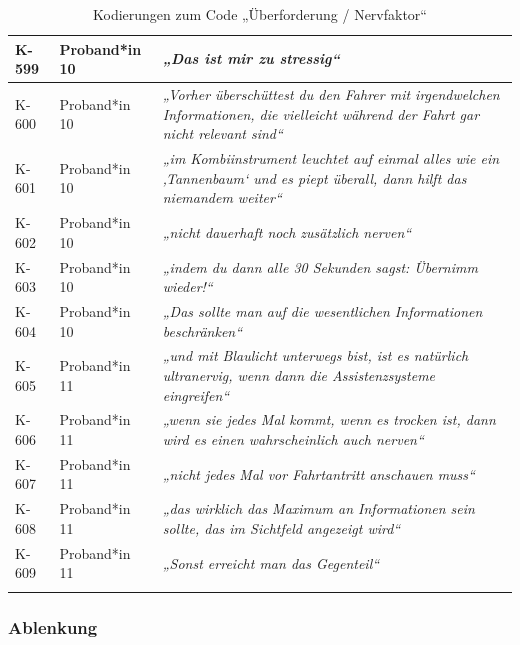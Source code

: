 {\begin{xltabular}{\textwidth}{
    |P{0.10\textwidth}
    |P{0.17\textwidth}
    |Y|
}
\hline
K-599 & Proband*in 10 & \textit{„Das ist mir zu stressig“} \\
\hline
K-600 & Proband*in 10 & \textit{„Vorher überschüttest du den Fahrer mit irgendwelchen Informationen, die vielleicht während der Fahrt gar nicht relevant sind“} \\
\hline
K-601 & Proband*in 10 & \textit{„im Kombiinstrument leuchtet auf einmal alles wie ein ‚Tannenbaum‘ und es piept überall, dann hilft das niemandem weiter“} \\
\hline
K-602 & Proband*in 10 & \textit{„nicht dauerhaft noch zusätzlich nerven“} \\
\hline
K-603 & Proband*in 10 & \textit{„indem du dann alle 30 Sekunden sagst: Übernimm wieder!“} \\
\hline
K-604 & Proband*in 10 & \textit{„Das sollte man auf die wesentlichen Informationen beschränken“} \\
\hline
K-605 & Proband*in 11 & \textit{„und mit Blaulicht unterwegs bist, ist es natürlich ultranervig, wenn dann die Assistenzsysteme eingreifen“} \\
\hline
K-606 & Proband*in 11 & \textit{„wenn sie jedes Mal kommt, wenn es trocken ist, dann wird es einen wahrscheinlich auch nerven“} \\
\hline
K-607 & Proband*in 11 & \textit{„nicht jedes Mal vor Fahrtantritt anschauen muss“} \\
\hline
K-608 & Proband*in 11 & \textit{„das wirklich das Maximum an Informationen sein sollte, das im Sichtfeld angezeigt wird“} \\
\hline
K-609 & Proband*in 11 & \textit{„Sonst erreicht man das Gegenteil“} \\
\hline
\caption{Kodierungen zum Code „Überforderung / Nervfaktor“}\label{tab:kodiernachweis-ueberforderung-nervfaktor}\\
\end{xltabular}
}

\clearpage
\subsubsection{Ablenkung}


